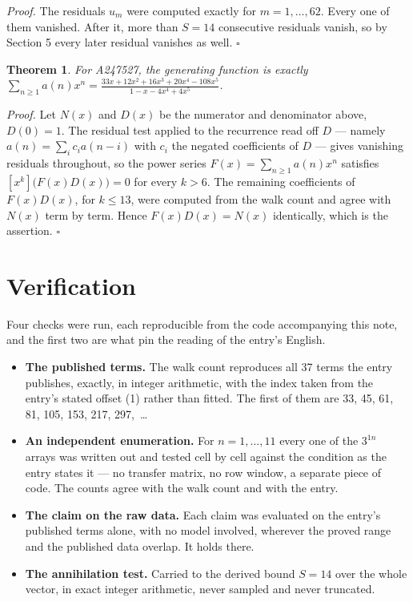 \documentclass[11pt]{article}
\newtheorem{theorem}{Theorem}
\theoremstyle{definition}
\begin{document}
{\itshape Proof.} The residuals $u_m$ were computed exactly for $m = 1,\dots,62$. Every one of them vanished. After it, more than $S = 14$ consecutive residuals vanish, so by Section 5 every later residual vanishes as well. $\square$

\begin{theorem} For A247527, the generating function is exactly $\sum_{n\ge 1} a(n)x^n = \frac{33x + 12x^{2} + 16x^{3} + 20x^{4} - 108x^{5}}{1 - x - 4x^{4} + 4x^{5}}$.\end{theorem}

{\itshape Proof.} Let $N(x)$ and $D(x)$ be the numerator and denominator above, $D(0)=1$. The residual test applied to the recurrence read off $D$ --- namely $a(n) = \sum_i c_i a(n-i)$ with $c_i$ the negated coefficients of $D$ --- gives vanishing residuals throughout, so the power series $F(x)=\sum_{n\ge 1}a(n)x^n$ satisfies $[x^k]\bigl(F(x)D(x)\bigr) = 0$ for every $k > 6$. The remaining coefficients of $F(x)D(x)$, for $k \le 13$, were computed from the walk count and agree with $N(x)$ term by term. Hence $F(x)D(x) = N(x)$ identically, which is the assertion. $\square$

\section{Verification}

Four checks were run, each reproducible from the code accompanying this note, and the first two are what pin the reading of the entry's English.

\begin{itemize}

\item {\bfseries The published terms.} The walk count reproduces all 37 terms the entry publishes, exactly, in integer arithmetic, with the index taken from the entry's stated offset (1) rather than fitted. The first of them are 33, 45, 61, 81, 105, 153, 217, 297,~\dots

\item {\bfseries An independent enumeration.} For $n = 1,\dots,11$ every one of the $3^{1n}$ arrays was written out and tested cell by cell against the condition as the entry states it --- no transfer matrix, no row window, a separate piece of code. The counts agree with the walk count and with the entry.

\item {\bfseries The claim on the raw data.} Each claim was evaluated on the entry's published terms alone, with no model involved, wherever the proved range and the published data overlap. It holds there.

\item {\bfseries The annihilation test.} Carried to the derived bound $S = 14$ over the whole vector, in exact integer arithmetic, never sampled and never truncated.

\end{itemize}
\end{document}

